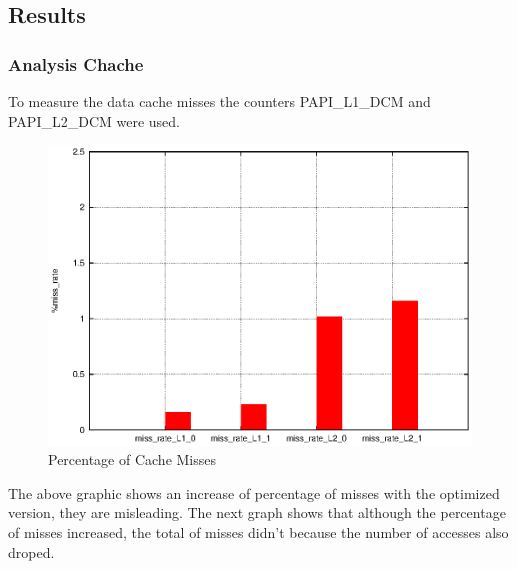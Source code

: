 \documentclass[a4paper,10pt,openright,openbib]{article}
\begin{document}
\subsection{Results}
\subsubsection{Analysis Chache}

 To measure the data cache misses the counters PAPI\_L1\_DCM and PAPI\_L2\_DCM were used.

\begin{figure}[!htp]
	\centering
	\begin{minipage}[t]{0.5\linewidth}
		\includegraphics[width=\textwidth]{images/caches.eps}
		\caption{Percentage of Cache Misses \label{fig:cachel1}}
	\end{minipage}
\end{figure}

The above graphic shows an increase of percentage of misses with the optimized version, they are misleading. The next graph shows that although the percentage of misses increased, the total of misses didn't because the number of accesses also droped.
\end{document}
